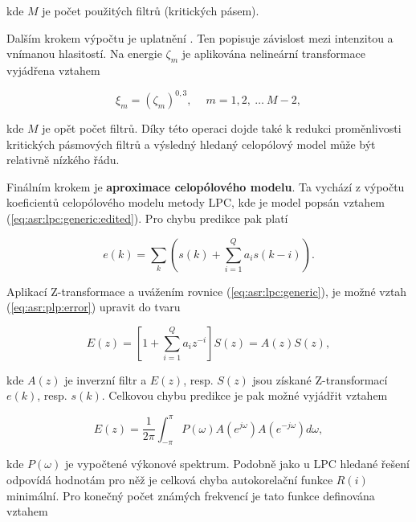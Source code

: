 \noindent kde $M$ je počet použitých filtrů (kritických pásem).

Dalším krokem výpočtu je uplatnění \textbf{}. Ten popisuje závislost mezi intenzitou a vnímanou hlasitostí. Na energie $\zeta_m$ je aplikována nelineární transformace vyjádřena vztahem

\begin{equation}
  \xi_m = \left(\zeta_m\right)^{0,3}, \quad\ m = 1, 2,\ \dots\ M-2,
  \label{eq:asr:plp:energy:transform}
\end{equation}

\noindent kde $M$ je opět počet filtrů. Díky této operaci dojde také k redukci proměnlivosti  kritických pásmových filtrů a výsledný hledaný celopólový model může být relativně nízkého řádu.

Finálním krokem je \textbf{aproximace celopólového modelu}. Ta vychází z výpočtu koeficientů celopólového modelu metody LPC, kde je model popsán vztahem (\ref{eq:asr:lpc:generic:edited}). Pro chybu predikce pak platí

\begin{equation}
  e\left(k\right) = \sum_{k} \left(s\left(k\right) + \sum_{i=1}^{Q} a_i s\left(k - i\right)\right).
  \label{eq:asr:plp:error}
\end{equation}

\noindent Aplikací Z-transformace a uvážením rovnice (\ref{eq:asr:lpc:generic}), je možné vztah (\ref{eq:asr:plp:error}) upravit do tvaru

\begin{equation}
  E\left(z\right) = \left[1 + \sum_{i=1}^{Q} a_i z^{-i}\right] S\left(z\right) = A\left(z\right)S\left(z\right),
  \label{eq:asr:plp:error:transform}
\end{equation}

\noindent kde $A\left(z\right)$ je inverzní filtr a $E\left(z\right)$, resp. $S\left(z\right)$ jsou získané Z-transformací $e\left(k\right)$, resp. $s\left(k\right)$. Celkovou chybu predikce je pak možné vyjádřit vztahem

\begin{equation}
  E\left(z\right) = \frac{1}{2\pi} \int_{-\pi}^{\pi} P\left(\omega\right) A\left(e^{j\omega}\right) A\left(e^{-j\omega}\right)d\omega,
  \label{eq:asr:plp:error:final}
\end{equation}

\noindent kde $P\left(\omega\right)$ je vypočtené výkonové spektrum. Podobně jako u LPC hledané řešení odpovídá hodnotám pro něž je celková chyba autokorelační funkce $R\left(i\right)$ minimální. Pro konečný počet známých frekvencí je tato funkce definována vztahem

